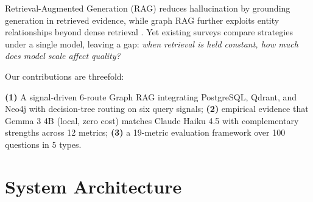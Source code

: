 \documentclass[10pt,conference,letterpaper]{IEEEtran}
\begin{document}
Retrieval-Augmented Generation (RAG) \cite{lewis2020} reduces hallucination by grounding generation in retrieved evidence, while graph RAG \cite{edge2024} further exploits entity relationships beyond dense retrieval \cite{karpukhin2020}. Yet existing surveys \cite{gao2024} compare strategies under a single model, leaving a gap: \textit{when retrieval is held constant, how much does model scale affect quality?}

Our contributions are threefold:

\textbf{(1)} A signal-driven 6-route Graph RAG integrating PostgreSQL, Qdrant, and Neo4j with decision-tree routing on six query signals;
\textbf{(2)} empirical evidence that Gemma 3 4B \cite{gemma2025} (local, zero cost) matches Claude Haiku 4.5 \cite{anthropic2024} with complementary strengths across 12 metrics;
\textbf{(3)} a 19-metric evaluation framework \cite{ragas2024} over 100 questions in 5 types.

\section{System Architecture}
\end{document}
